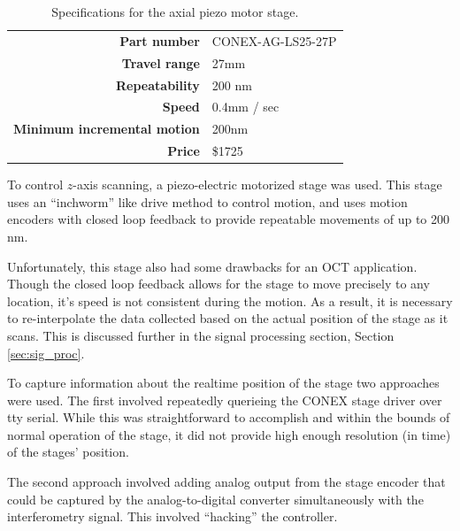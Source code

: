 \begin{table}[h!]
\centering
\begin{tabular}{ >{\bf}r | l}
Part number & CONEX-AG-LS25-27P\\
Travel range & 27mm  \\
Repeatability & 200 nm \\
Speed & 0.4mm / sec \\
Minimum incremental motion & 200nm \\
Price & \$1725 \\
\end{tabular}
\caption{Specifications for the axial piezo motor stage.}
\end{table}

To control $z$-axis scanning, a piezo-electric motorized stage was used. This stage uses an ``inchworm'' like drive method to control motion, and uses motion encoders with closed loop feedback to provide repeatable movements of up to 200 nm.

Unfortunately, this stage also had some drawbacks for an OCT application. Though the closed loop feedback allows for the stage to move precisely to any location, it's speed is not consistent during the motion. As a result, it is necessary to re-interpolate the data collected based on the actual position of the stage as it scans. This is discussed further in the signal processing section, Section \ref{sec:sig_proc}.

To capture information about the realtime position of the stage two approaches were used. The first involved repeatedly querieing the CONEX stage driver over tty serial. While this was straightforward to accomplish and within the bounds of normal operation of the stage, it did not provide high enough resolution (in time) of the stages' position.

The second approach involved adding analog output from the stage encoder that could be captured by the analog-to-digital converter simultaneously with the interferometry signal. This involved ``hacking'' %
the controller.

